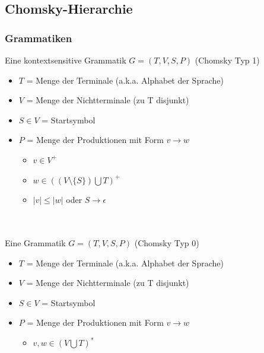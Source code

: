 \subsection{Chomsky-Hierarchie}
\begin{frame}
	\frametitle{Grammatiken}
Eine kontextsensitive Grammatik $G = ( T, V, S, P)$ (Chomsky Typ 1)
\begin{itemize}
	\item $T$ = Menge der Terminale (a.k.a. Alphabet der Sprache)
	\item $V$ = Menge der Nichtterminale (zu T disjunkt)
	\item $S \in V$ = Startsymbol
	\item $P$ = Menge der Produktionen mit Form $v \rightarrow w$
	\begin{itemize}
		\item $v \in V^{+}$
		\item $w \in ((V \setminus \{S\}) \bigcup T)^{+}$
		\item $|v| \leq |w|$ oder $S \rightarrow \epsilon$
	\end{itemize}
\end{itemize}~\\~\\




Eine Grammatik $G = ( T, V, S, P)$ (Chomsky Typ 0)
\begin{itemize}
	\item $T$ = Menge der Terminale (a.k.a. Alphabet der Sprache)
	\item $V$ = Menge der Nichtterminale (zu T disjunkt)
	\item $S \in V$ = Startsymbol
	\item $P$ = Menge der Produktionen mit Form $v \rightarrow w$
	\begin{itemize}
		\item $v,w \in (V \bigcup T)^{*}$
	\end{itemize}
\end{itemize}
\end{frame}


